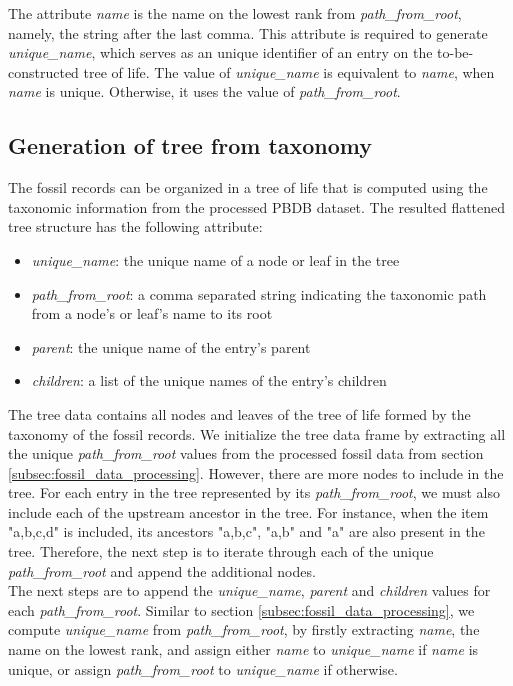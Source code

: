 \documentclass[11pt, a4paper,oneside,chapterprefix=false]{scrbook}
\begin{document}
The attribute \emph{name} is the name on the lowest rank from \emph{path\_from\_root}, namely, the string after the last comma. This attribute is required to generate \emph{unique\_name}, which serves as an unique identifier of an entry on the to-be-constructed tree of life. The value of \emph{unique\_name} is equivalent to \emph{name}, when \emph{name} is unique. Otherwise, it uses the value of \emph{path\_from\_root}.

\subsection{Generation of tree from taxonomy} \label{subsec:tree_generation}
The fossil records can be organized in a tree of life that is computed using the taxonomic information from the processed PBDB dataset. The resulted flattened tree structure has the following attribute:

\begin{itemize}
	\item \textit{unique\_name}: the unique name of a node or leaf in the tree
	\item \textit{path\_from\_root}: a comma separated string indicating the taxonomic path from a node's or leaf's name to its root
	\item \textit{parent}: the unique name of the entry's parent
	\item \textit{children}: a list of the unique names of the entry's children
\end{itemize}

The tree data contains all nodes and leaves of the tree of life formed by the taxonomy of the fossil records. We initialize the tree data frame by extracting all the unique \emph{path\_from\_root} values from the processed fossil data from section \ref{subsec:fossil_data_processing}. However, there are more nodes to include in the tree. For each entry in the tree represented by its \emph{path\_from\_root}, we must also include each of the upstream ancestor in the tree. For instance, when the item "a,b,c,d" is included, its ancestors "a,b,c", "a,b" and "a" are also present in the tree. Therefore, the next step is to iterate through each of the unique \emph{path\_from\_root} and append the additional nodes. \\

The next steps are to append the \emph{unique\_name}, \emph{parent} and \emph{children} values for each \emph{path\_from\_root}. Similar to section \ref{subsec:fossil_data_processing}, we compute \emph{unique\_name} from \emph{path\_from\_root}, by firstly extracting \emph{name}, the name on the lowest rank, and assign either \emph{name} to \emph{unique\_name} if \emph{name} is unique, or assign \emph{path\_from\_root} to \emph{unique\_name} if otherwise. \\
\end{document}
